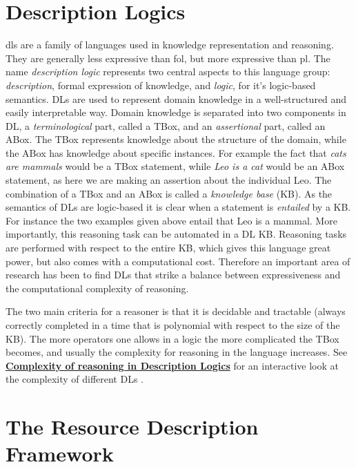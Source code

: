 \section{Description Logics}
\gls{dls} are a family of languages used in knowledge representation and reasoning. They are generally less expressive than \gls{fol}, but more expressive than \gls{pl}. The name \textit{description logic} represents two central aspects to this language group: \emph{description}, formal expression of knowledge, and  \emph{logic}, for it's logic-based semantics. DLs are used to represent domain knowledge in a well-structured and easily interpretable way. Domain knowledge is separated into two components in DL, a \emph{terminological} part, called a TBox, and an \emph{assertional} part, called an ABox. The TBox represents knowledge about the structure of the domain, while the ABox has knowledge about specific instances. For example the fact that \emph{cats are  mammals} would be a TBox statement, while \emph{Leo is a cat} would be an ABox statement, as here we are making an assertion about the individual Leo. The combination of a TBox and an ABox is called a \emph{knowledge base} (KB).
As the semantics of DLs are logic-based it is clear when a statement is \emph{entailed} by a KB. For instance the two examples given above entail that Leo is a mammal. More importantly, this reasoning task can be automated in a DL KB. Reasoning tasks are performed with respect to the entire KB, which gives this language great power, but also comes with a computational cost. Therefore an important area of research has been to find DLs that strike a balance between expressiveness and the computational complexity of reasoning.


The two main criteria for a reasoner is that it is decidable and tractable (always correctly completed in a time that is polynomial with respect to the size of the KB). The more operators one allows in a logic the more complicated the TBox becomes, and usually the complexity for reasoning in the language increases. See \href{http://www.cs.man.ac.uk/~ezolin/dl/}{\textbf{Complexity of reasoning in Description Logics}} for an interactive look at the complexity of different DLs \cite{zolin_2013}.

\section{The Resource Description Framework}

